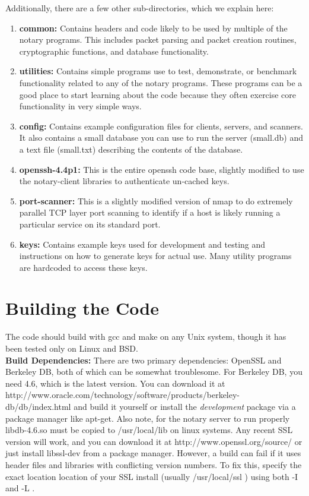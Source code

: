 \documentclass[pdftex,singlecolumn,11pt,letterpaper]{article}
\begin{document}
\noindent 
Additionally, there are a few other sub-directories, which we explain here:
\begin{enumerate}
\item \textbf{common:}  Contains headers and code likely to be used 
by multiple
of the notary programs.  This includes packet parsing and packet creation 
routines, cryptographic functions, and database functionality.  
\item \textbf{utilities:} Contains simple programs use to test, demonstrate,
or benchmark functionality related to any of the notary programs.  These 
programs can be a good place to start learning about the code because they 
often exercise core functionality in very simple ways. 
\item \textbf{config:} Contains example configuration files for clients, 
servers, and scanners.  It also contains a small database you can use to
run the server (small.db) and a text file (small.txt) describing the 
contents of the database.  
\item \textbf{openssh-4.4p1:}  This is the entire openssh code base, slightly
modified to use the notary-client libraries to authenticate un-cached keys.  
\item \textbf{port-scanner:} This is a slightly modified version of nmap to 
do extremely parallel TCP layer port scanning to identify if a host is likely
running a particular service on its standard port.  
\item \textbf{keys:} Contains example keys used for development and testing 
and instructions on how to generate keys for actual use.  Many utility 
programs are hardcoded to access these keys.   
\end{enumerate}

\section{Building the Code}

The code should build with gcc and make on any Unix system, though it has
been tested only on Linux and BSD. \\  

\noindent\textbf{Build Dependencies:} There are two primary dependencies:
OpenSSL and Berkeley DB, both of which can be somewhat troublesome.   
For Berkeley DB, you need 4.6, which is the latest version.  You can 
download it at http://www.oracle.com/technology/software/products/berkeley-db/db/index.html and build it yourself or install the \emph{development} package
via a package manager like apt-get.  Also note, for the notary server to
run properly libdb-4.6.so must be copied to /usr/local/lib on linux
systems.
Any recent SSL version will work, and
you can download it at http://www.openssl.org/source/ or just install 
libssl-dev from a package manager.  However, a build
can fail if it uses header files and libraries with conflicting version 
numbers.  To fix this, specify the exact location location of your SSL 
install (usually /usr/local/ssl ) using both -I and -L . \\ 
\end{document}
